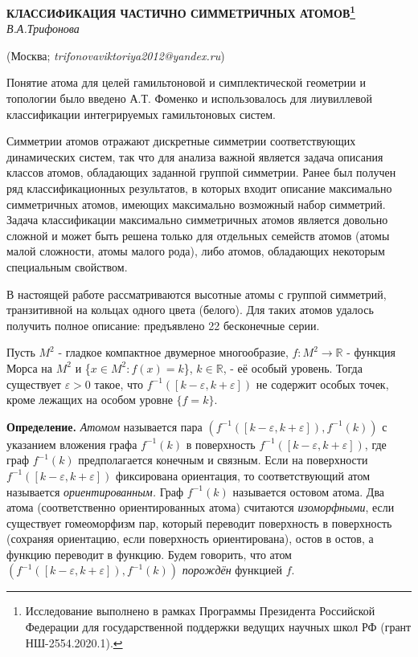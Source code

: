 
\begin{center}
    {\bf КЛАССИФИКАЦИЯ  ЧАСТИЧНО СИММЕТРИЧНЫХ АТОМОВ\footnote{Исследование выполнено в рамках Программы Президента Российской Федерации для государственной поддержки ведущих научных школ РФ (грант НШ-2554.2020.1).}}\\

    {\it В.А.Трифонова}

    (Москва; {\it trifonovaviktoriya2012@yandex.ru})
\end{center}


Понятие атома для целей гамильтоновой и симплектической геометрии и топологии было введено А.Т.  Фоменко  и использовалось для лиувиллевой классификации интегрируемых гамильтоновых систем.


Симметрии атомов отражают дискретные симметрии соответствующих динамических систем, так что для  анализа важной является задача описания классов атомов, обладающих заданной группой симметрии. Ранее был получен ряд классификационных результатов, в которых входит описание максимально симметричных атомов, имеющих максимально возможный набор симметрий.  Задача классификации максимально симметричных атомов является довольно сложной  и может быть решена только для отдельных семейств атомов (атомы малой сложности, атомы малого рода), либо атомов, обладающих некоторым специальным свойством.

В 	настоящей работе рассматриваются высотные атомы с группой симметрий, транзитивной на кольцах одного цвета (белого). Для таких атомов удалось получить полное описание: предъявлено 22  бесконечные серии.




Пусть $M^2$ - гладкое компактное двумерное многообразие,  $f:M^2 \to \mathbb{R}$ - функция Морса	на $M^2$ и  \{$x\in M^2 \colon f(x)=k $\}, $k \in \mathbb{R}$, - её особый уровень. Тогда существует ${\varepsilon > 0}$ такое, что ${f^{-1}([k-\varepsilon, k+\varepsilon ])}$ не содержит особых точек, кроме лежащих на особом уровне		$\{f=k\}$.
		
		
		
		{\bf Определение.}
		{\em Атомом} называется пара ${(f^{-1}([k-\varepsilon, k+\varepsilon ]), f^{-1}(k))}$ с указанием вложения графа ${f^{-1}(k)}$ в поверхность ${f^{-1}([k-\varepsilon, k+\varepsilon ])}$, где граф  ${f^{-1}(k)}$ предполагается конечным и связным. Если на поверхности ${f^{-1}([k-\varepsilon, k+\varepsilon ])}$ фиксирована ориентация, то соответствующий атом называется {\em  ориентированным.} Граф  ${f^{-1}(k)}$ называется остовом атома. Два атома (соответственно ориентированных атома) считаются {\em изоморфными}, если существует гомеоморфизм пар, который переводит поверхность в поверхность (сохраняя ориентацию, если поверхность ориентирована), остов в остов, а функцию переводит в функцию. Будем говорить, что атом
${(f^{-1}([k-\varepsilon, k+\varepsilon ]),f^{-1}(k))}$ {\em порождён} функцией $f$.





